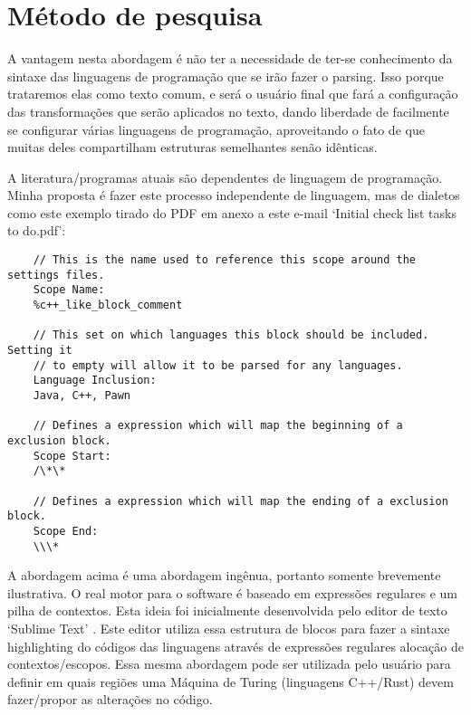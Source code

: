 


\section{Método de pesquisa}

    A vantagem nesta abordagem é não ter a necessidade de ter-se conhecimento da sintaxe das linguagens
    de programação que se irão fazer o parsing. Isso porque trataremos elas como texto comum, e será
    o usuário final que fará a configuração das transformações que serão aplicados no texto, dando
    liberdade de facilmente se configurar várias linguagens de programação, aproveitando o fato de que
    muitas deles compartilham estruturas semelhantes senão idênticas.

    A literatura/programas atuais são dependentes de linguagem de programação. Minha proposta é fazer este
    processo independente de linguagem, mas de dialetos como este exemplo tirado do PDF em anexo a este e-mail
    `Initial check list tasks to do.pdf':

    \begin{lstlisting}
    // This is the name used to reference this scope around the settings files.
    Scope Name:
    %c++_like_block_comment

    // This set on which languages this block should be included. Setting it
    // to empty will allow it to be parsed for any languages.
    Language Inclusion:
    Java, C++, Pawn

    // Defines a expression which will map the beginning of a exclusion block.
    Scope Start:
    /\*\*

    // Defines a expression which will map the ending of a exclusion block.
    Scope End:
    \\\*
    \end{lstlisting}
    \vspace*{-4mm}

    A abordagem acima é uma abordagem ingênua, portanto somente brevemente ilustrativa. O real motor
    para o software é baseado em expressões regulares e um pilha de contextos. Esta ideia foi
    inicialmente desenvolvida pelo editor de texto `Sublime Text' \cite{Skinner}. Este editor
    utiliza essa estrutura de blocos para fazer a sintaxe highlighting do códigos das linguagens
    através de expressões regulares alocação de contextos/escopos. Essa mesma abordagem pode ser
    utilizada pelo usuário para definir em quais regiões uma Máquina de Turing (linguagens C++/Rust)
    devem fazer/propor as alterações no código.


